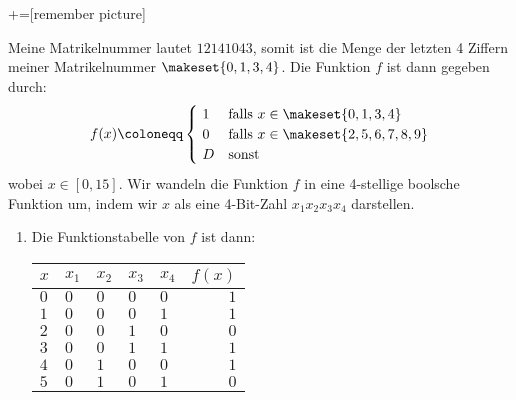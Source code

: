 \newcommand{\boxy}[2][yellow]{\mathchoice%
  {\pgfsetfillopacity{0.3}\colorbox{#1}{\pgfsetfillopacity{1}$\displaystyle#2$}}%
  {\pgfsetfillopacity{0.3}\colorbox{#1}{\pgfsetfillopacity{1}$\textstyle#2$}}%
  {\pgfsetfillopacity{0.3}\colorbox{#1}{\pgfsetfillopacity{1}$\scriptstyle#2$}}%
  {\pgfsetfillopacity{0.3}\colorbox{#1}{\pgfsetfillopacity{1}$\scriptscriptstyle#2$}}}%

\let\not\xoverline
\let\nor\downarrow
\newcommand{\xor}[2]{\not{#1}#2 \lor #1\not{#2}}
+=[remember picture]

\begin{enumerate}[label={[OH\arabic*]},start=1]
    \item Meine Matrikelnummer lautet $12141043$, somit ist die Menge der letzten 4 Ziffern meiner Matrikelnummer $\makeset{0, 1, 3, 4}$. Die Funktion $f$ ist dann gegeben durch:
        \begin{equation*}
            f(x) \coloneqq 
            \begin{cases}
                ~1 & \text{falls } x \in \makeset{0, 1, 3, 4} \\
                ~0 & \text{falls } x \in \makeset{2, 5, 6, 7, 8, 9} \\
                ~D & \text{sonst}
            \end{cases}
        \end{equation*}
        wobei $x \in [0, 15]$. Wir wandeln die Funktion $f$ in eine 4-stellige boolsche Funktion um, indem wir $x$ als eine 4-Bit-Zahl $x_1x_2x_3x_4$ darstellen.
        \begin{enumerate}
            \item Die Funktionstabelle von $f$ ist dann:
                \begin{center}
                    \begin{tabular}{lllllr}
                        \toprule
                        $x$ & $x_1$ & $x_2$ & $x_3$ & $x_4$ & $f(x)$ \\
                        \midrule
                        $0$ & $0$ & $0$ & $0$ & $0$ & $1$ \\
                        $1$ & $0$ & $0$ & $0$ & $1$ & $1$ \\
                        $2$ & $0$ & $0$ & $1$ & $0$ & $0$ \\
                        $3$ & $0$ & $0$ & $1$ & $1$ & $1$ \\
                        $4$ & $0$ & $1$ & $0$ & $0$ & $1$ \\
                        $5$ & $0$ & $1$ & $0$ & $1$ & $0$ \\

\end{tabular}
\end{center}
\end{enumerate}
\end{enumerate}
